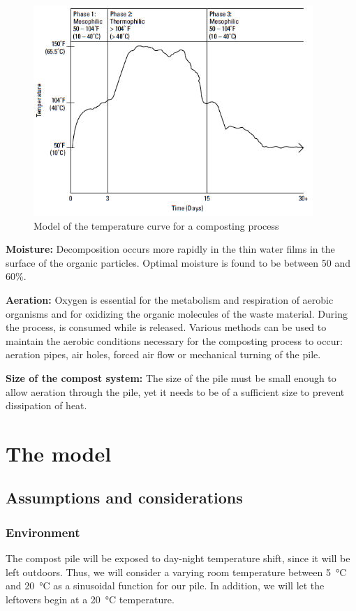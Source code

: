 \documentclass[12pt, a4paper, twocolumn]{article}
\numberwithin{table}{section}
\numberwithin{figure}{section}
\numberwithin{equation}{section}
\begin{document}
\begin{figure}[htb]
	\sffamily \footnotesize \centering
	\includegraphics[scale=0.55]{model-T.jpg}
	\caption{Model of the temperature curve for a composting process}
	\label{fig:temp-arees}
\end{figure}

\textbf{Moisture:} Decomposition occurs more rapidly in the thin water films in the surface of the organic particles. Optimal moisture is found to be between 50 and 60\%.

\textbf{Aeration:} Oxygen is essential for the metabolism and respiration of aerobic organisms and for oxidizing the organic molecules of the waste material. During the process,  is consumed while  is released. Various methods can be used to maintain the aerobic conditions necessary for the composting process to occur: aeration pipes, air holes, forced air flow or mechanical turning of the pile.

\textbf{Size of the compost system:} The size of the pile must be small enough to allow aeration through the pile, yet it needs to be of a sufficient size to prevent dissipation of heat.
\section{The model}
\subsection{Assumptions and considerations}
\subsubsection{Environment}

The compost pile will be exposed to day-night temperature shift, since it will be left outdoors. Thus, we will consider a varying room temperature between \SI{5}{\celsius} and \SI{20}{\celsius} as a sinusoidal function for our pile. In addition, we will let the leftovers begin at a \SI{20}{\celsius} temperature.  
\end{document}
